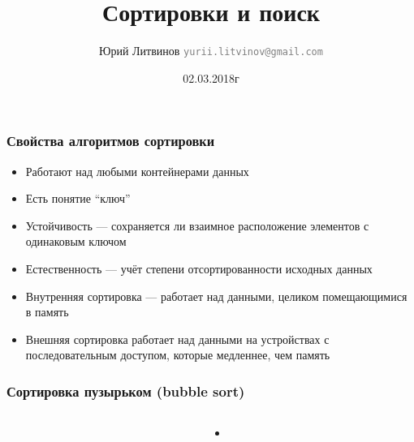 \documentclass[xetex,mathserif,serif]{beamer}
\title{Сортировки и поиск}
\author[Юрий Литвинов]{Юрий Литвинов \newline \textcolor{gray}{\small\texttt{yurii.litvinov@gmail.com}}}
\date{02.03.2018г}
\begin{document}
	
	\frame{\titlepage}

	\begin{frame}
		\frametitle{Свойства алгоритмов сортировки}
		\begin{itemize}
			\item Работают над любыми контейнерами данных
			\item Есть понятие ``ключ''
			\item Устойчивость --- сохраняется ли взаимное расположение элементов с одинаковым ключом
			\item Естественность --- учёт степени отсортированности исходных данных
			\item Внутренняя сортировка --- работает над данными, целиком помещающимися в память
			\item Внешняя сортировка работает над данными на устройствах с последовательным доступом, которые медленнее, чем память
		\end{itemize}
	\end{frame}

	\begin{frame}
		\frametitle{Сортировка пузырьком (bubble sort)}
		\begin{columns}
			\begin{column}{0.25\textwidth}
			\end{column}
			\begin{column}{0.75\textwidth}
				\begin{itemize}
					\item
				\end{itemize}
			\end{column}
		\end{columns}
	\end{frame}
\end{document}
